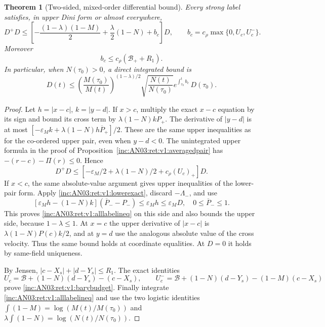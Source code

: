 \documentclass[11pt]{article}
\numberwithin{equation}{section}
\newtheorem{theorem}{Theorem}[section]
\theoremstyle{remark}\newtheorem{remark}[theorem]{Remark}
\newcommand{\1}{\mathbf 1}
\begin{document}
\begin{theorem}[Two-sided, mixed-order differential bound]
\label{inc:AN03:ret:v1:alllabel}
Every strong label satisfies, in upper Dini form or almost everywhere,
\begin{equation}\label{inc:AN03:ret:v1:alllabelineq}
 D^+D\le
 \left[-\frac{(1-\lambda)(1-M)}2+
       \frac\lambda2(1-N)+b_c\right]D,
 \qquad
 b_c=c_\rho\max\{0,U_c,U_c^-\}.
\end{equation}
Moreover
\begin{equation}\label{inc:AN03:ret:v1:barybudget}
 b_c\le c_\rho(\mathcal B_++R_1).
\end{equation}
In particular, when $N(\tau_0)>0$, a direct integrated bound is
\begin{equation}\label{inc:AN03:ret:v1:Gdirect}
 D(t)\le
 \left(\frac{M(\tau_0)}{M(t)}\right)^{(1-\lambda)/2}
 \sqrt{\frac{N(t)}{N(\tau_0)}}
 e^{\int_{\tau_0}^t b_c}\,D(\tau_0).
\end{equation}
\end{theorem}
\begin{proof}
Let $h=|x-c|$, $k=|y-d|$. If $x>c$, multiply the exact $x-c$
equation by its sign and bound its cross term by
$\lambda(1-N)kP_+$. The derivative of $|y-d|$ is at most
$[-\varepsilon_Mk+\lambda(1-N)h\overline P_+]/2$.
These are the same upper inequalities as for the co-ordered upper pair,
even when $y-d<0$. The unintegrated upper formula in the proof of
Proposition~\ref{inc:AN03:ret:v1:averagedpair} has
$-(r-c)-\Pi(r)\le0$. Hence
\[
 D^+D\le[-\varepsilon_M/2+\lambda(1-N)/2+c_\rho(U_c)_+]D.
\]
If $x<c$, the same absolute-value argument gives upper inequalities of
the lower-pair form. Apply \eqref{inc:AN03:ret:v1:lowerexact}, discard
$-\Lambda_-$, and use
\[
 [\varepsilon_Mh-(1-N)k](\overline P_--P_-)
 \le\varepsilon_Mh\le\varepsilon_MD,
 \quad 0\le\overline P_-\le1.
\]
This proves \eqref{inc:AN03:ret:v1:alllabelineq} on this side and also
bounds the upper side, because $1-\lambda\le1$.
At $x=c$ the upper derivative of $|x-c|$ is
$\lambda(1-N)P(c)k/2$, and at $y=d$ use the analogous absolute
value of the cross velocity. Thus the same bound holds at coordinate
equalities. At $D=0$ it holds by same-field uniqueness.

By Jensen,
$|c-X_s|+|d-Y_s|\le R_1$.
The exact identities
\[
 U_c=\mathcal B+(1-N)(d-Y_s)-(c-X_s),\qquad
 U_c^-=\mathcal B+(1-N)(d-Y_s)-(1-M)(c-X_s)
\]
prove \eqref{inc:AN03:ret:v1:barybudget}.
Finally integrate \eqref{inc:AN03:ret:v1:alllabelineq} and use the two
logistic identities $\int(1-M)=\log(M(t)/M(\tau_0))$ and
$\lambda\int(1-N)=\log(N(t)/N(\tau_0))$.
\end{proof}
\end{document}
